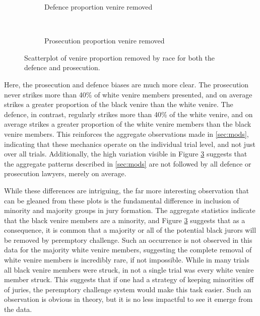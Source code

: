 \begin{figure}[h!]
  \centering
  \begin{subfigure}{0.7\textwidth}
    \caption{\footnotesize Defence proportion venire removed}
    \label{fig:defraceprop}
  \end{subfigure}
  ~
  \begin{subfigure}{0.7\textwidth}
    \caption{\footnotesize Prosecution proportion venire removed}
    \label{fig:proraceprop}
  \end{subfigure}
  \caption[Racial Strike Proportions by Party]
  {\footnotesize Scatterplot of venire proportion removed by race for both the defence and prosecution.}
  \label{fig:defproprop}
\end{figure}

Here, the prosecution and defence biases are much more clear. The prosecution never strikes more than 40\% of white venire members
presented, and on average strikes a greater proportion of the black venire than the white venire. The defence, in contrast,
regularly strikes more than 40\% of the white venire, and on average strikes a greater proportion of the white venire members than
the black venire members. This reinforces the aggregate observations made in \ref{sec:mods}, indicating that these mechanics
operate on the individual trial level, and not just over all trials. Additionally, the high variation visible in Figure
\ref{fig:defproprop} suggests that the aggregate patterns described in \ref{sec:mods} are not followed by all defence or
prosecution lawyers, merely on average.

While these differences are intriguing, the far more interesting observation that can be gleaned from these plots is the
fundamental difference in inclusion of minority and majority groups in jury formation. The aggregate statistics indicate that the
black venire members are a minority, and Figure \ref{fig:defproprop} suggests that as a consequence, it is common that a majority
or all of the potential black jurors will be removed by peremptory
challenge. Such an occurrence is not observed in this data for the
majority white venire members, suggesting the complete removal of
white venire members is incredibly rare, if not impossible. While in many trials all black venire members were struck, in not a single trial was
every white venire member struck. This suggests that if one had a strategy of keeping minorities off of juries, the peremptory
challenge system would make this task easier. Such an observation is obvious in theory, but it is no less impactful to see it
emerge from the data.

